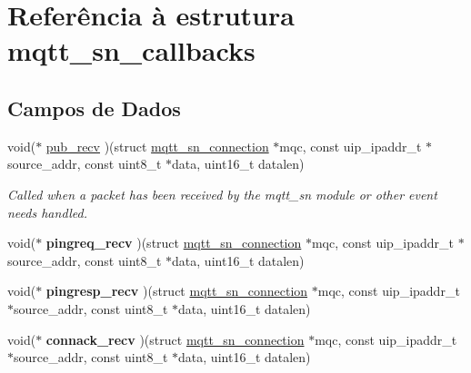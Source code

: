 \hypertarget{structmqtt__sn__callbacks}{\section{Referência à estrutura mqtt\+\_\+sn\+\_\+callbacks}
\label{structmqtt__sn__callbacks}
}
\subsection*{Campos de Dados}
\begin{DoxyCompactItemize}
\item 
\hypertarget{structmqtt__sn__callbacks_a52516850dd00bb113cbface2a0b2a9d8}{void($\ast$ \hyperlink{structmqtt__sn__callbacks_a52516850dd00bb113cbface2a0b2a9d8}{pub\+\_\+recv} )(struct \hyperlink{structmqtt__sn__connection}{mqtt\+\_\+sn\+\_\+connection} $\ast$mqc, const uip\+\_\+ipaddr\+\_\+t $\ast$source\+\_\+addr, const uint8\+\_\+t $\ast$data, uint16\+\_\+t datalen)}\label{structmqtt__sn__callbacks_a52516850dd00bb113cbface2a0b2a9d8}

\begin{DoxyCompactList}\small\item\em Called when a packet has been received by the mqtt\+\_\+sn module or other event needs handled. \end{DoxyCompactList}\item 
\hypertarget{structmqtt__sn__callbacks_af8239d3686b4a4d0e2a6c1d4196dc16a}{void($\ast$ {\bfseries pingreq\+\_\+recv} )(struct \hyperlink{structmqtt__sn__connection}{mqtt\+\_\+sn\+\_\+connection} $\ast$mqc, const uip\+\_\+ipaddr\+\_\+t $\ast$source\+\_\+addr, const uint8\+\_\+t $\ast$data, uint16\+\_\+t datalen)}\label{structmqtt__sn__callbacks_af8239d3686b4a4d0e2a6c1d4196dc16a}

\item 
\hypertarget{structmqtt__sn__callbacks_ae0badde8eb4b728bf6eac9e562103a86}{void($\ast$ {\bfseries pingresp\+\_\+recv} )(struct \hyperlink{structmqtt__sn__connection}{mqtt\+\_\+sn\+\_\+connection} $\ast$mqc, const uip\+\_\+ipaddr\+\_\+t $\ast$source\+\_\+addr, const uint8\+\_\+t $\ast$data, uint16\+\_\+t datalen)}\label{structmqtt__sn__callbacks_ae0badde8eb4b728bf6eac9e562103a86}

\item 
\hypertarget{structmqtt__sn__callbacks_a53cadbe7c09b5c0e5bf907faa4f53bc2}{void($\ast$ {\bfseries connack\+\_\+recv} )(struct \hyperlink{structmqtt__sn__connection}{mqtt\+\_\+sn\+\_\+connection} $\ast$mqc, const uip\+\_\+ipaddr\+\_\+t $\ast$source\+\_\+addr, const uint8\+\_\+t $\ast$data, uint16\+\_\+t datalen)}\label{structmqtt__sn__callbacks_a53cadbe7c09b5c0e5bf907faa4f53bc2}


\end{DoxyCompactItemize}
